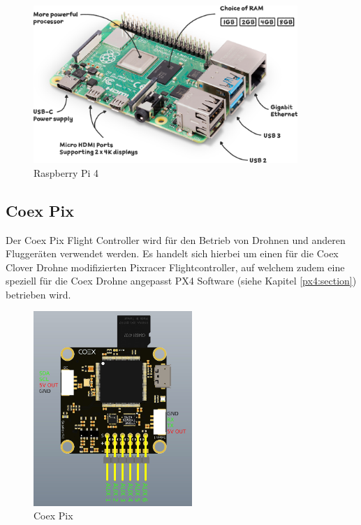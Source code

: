 \begin{figure}[H]
    \centering
    \includegraphics[width=10cm,keepaspectratio,angle=0]{images/raspberry-pi-4-labelled.png}
    \caption[Raspberry Pi 4]{\label{img raspberry_pi} Raspberry Pi 4 \cite{imgraspberrypi}}
\end{figure}



\subsection{Coex Pix} \label{coex_pix:subsection}
Der Coex Pix Flight Controller wird für den Betrieb von Drohnen und anderen Fluggeräten verwendet werden. Es handelt sich hierbei um einen für die Coex Clover Drohne modifizierten Pixracer Flightcontroller, auf welchem zudem eine speziell für die Coex Drohne angepasst PX4 Software (siehe Kapitel \ref{px4:section}) betrieben wird. \\

\begin{figure}[htpb]
    \centering
    \includegraphics[width=6cm,keepaspectratio,angle=0]{images/coexpix-top.jpg}
    \caption[Coex Pix]{\label{img coex_pix} Coex Pix \cite{imgcoexpix}}
\end{figure}

